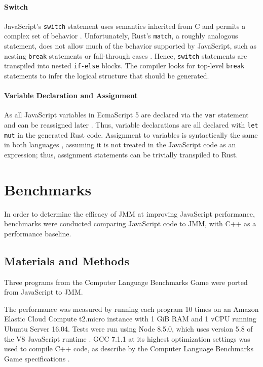 \documentclass[12pt]{article}
\begin{document}
	\paragraph{Switch}
	
	JavaScript's \texttt{switch} statement uses semantics inherited from C and permits a complex set of behavior \cite{Motto2014}. Unfortunately, Rust's \texttt{match}, a roughly analogous statement, does not allow much of the behavior supported by JavaScript, such as nesting \texttt{break} statements or fall-through cases \cite{Klabnik}. Hence, \texttt{switch} statements are transpiled into nested \texttt{if-else} blocks. The compiler looks for top-level \texttt{break} statements to infer the logical structure that should be generated.
	
	\paragraph{Variable Declaration and Assignment}
	
	As all JavaScript variables in EcmaScript 5 are declared via the \texttt{var} statement and can be reassigned later \cite{ecmascript2011ecmascript}. Thus, variable declarations are all declared with \texttt{let mut} in the generated Rust code. Assignment to variables is syntactically the same in both languages \cite{Klabnik}\cite{ecmascript2011ecmascript}, assuming it is not treated in the JavaScript code as an expression; thus, assignment statements can be trivially transpiled to Rust.
	
	\section{Benchmarks}
	
	In order to determine the efficacy of JMM at improving JavaScript performance, benchmarks were conducted comparing JavaScript code to JMM, with C++ as a performance baseline.
	
	\subsection{Materials and Methods}
	
	Three programs from the Computer Language Benchmarks Game \cite{Guoy} were ported from JavaScript to JMM.
	
	The performance was measured by running each program 10 times on an Amazon Elastic Cloud Compute t2.micro instance with 1 GiB RAM and 1 vCPU \cite{aws} running Ubuntu Server 16.04.	Tests were run using Node 8.5.0, which uses version 5.8 of the V8 JavaScript runtime \cite{Snell2017}. GCC 7.1.1 at its highest optimization settings was used to compile C++ code, as describe by the Computer Language Benchmarks Game specifications \cite{Guoy}.
	
\end{document}
